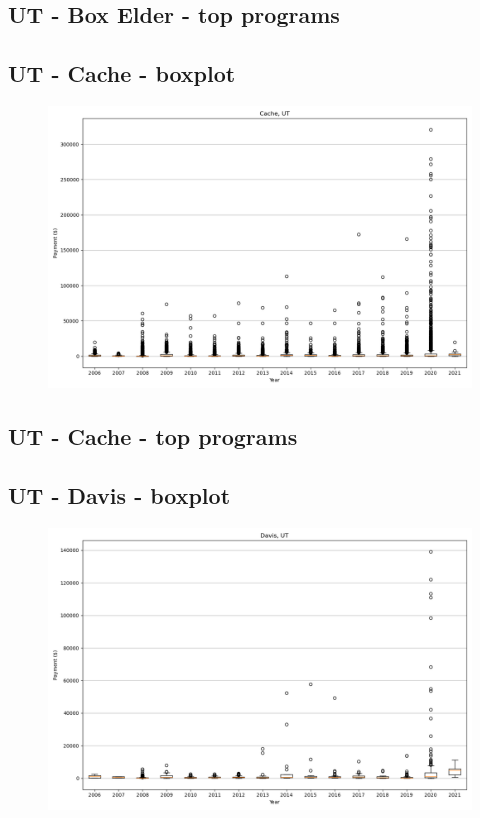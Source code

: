 \subsection*{UT - Box Elder - top programs}

\newpage
\subsection*{UT - Cache - boxplot}
\begin{figure}[h]
\centering
\includegraphics[width=7in]{../output/boxplots/counties/Cache-UT_boxplot.png}
\end{figure}


\subsection*{UT - Cache - top programs}

\newpage
\subsection*{UT - Davis - boxplot}
\begin{figure}[h]
\centering
\includegraphics[width=7in]{../output/boxplots/counties/Davis-UT_boxplot.png}
\end{figure}


